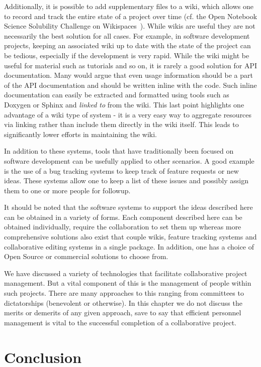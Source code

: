 \documentclass[11pt]{book}
\begin{document}
Additionally, it is possible to add supplementary files to a wiki,
which allows one to record and track the entire state of a project
over time (cf. the Open Notebook Science Solubility Challenge on
Wikispaces~\cite{ons:exp34}). While wikis are useful they are not necessarily the
best solution for all cases. For example, in software development
projects, keeping an associated wiki up to date with the state of the
project can be tedious, especially if the development is very
rapid. While the wiki might be useful for material such as tutorials
and so on, it is rarely a good solution for API documentation. Many
would argue that even usage information should be a part of the API
documentation and should be written inline with the code. Such inline
documentation can easily be extracted and formatted using tools such
as Doxygen or Sphinx and \emph{linked to} from the wiki. This last
point highlights one advantage of a wiki type of system - it is a very
easy way to aggregate resources via linking rather than include them
directly in the wiki itself. This leads to significantly lower efforts
in maintaining the wiki.

In addition to these systems, tools that have traditionally been
focused on software development can be usefully applied to other
scenarios. A good example is the use of a bug tracking systems to keep
track of feature requests or new ideas. These systems allow one to
keep a list of these issues and possibly assign them to one or more
people for followup.

It should be noted that the software systems to support the ideas
described here can be obtained in a variety of forms. Each component
described here can be obtained individually, require the collaboration
to set them up whereas more comprehensive solutions also exist that
couple wikis, feature tracking systems and collaborative editing
systems in a single package. In addition, one has a choice of Open
Source or commercial solutions to choose from.

We have discussed a variety of technologies that facilitate
collaborative project management. But a vital component of this is the
management of people within such projects. There are many approaches to
this ranging from committees to dictatorships (benevolent or
otherwise). In this chapter we do not discuss the merits or demerits
of any given approach, save to say that efficient personnel management
is vital to the successful completion of a collaborative project.

\section{Conclusion}
\end{document}
